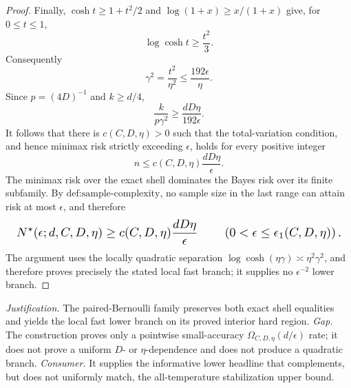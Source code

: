 \documentclass{article}
\begin{document}
\begin{proof}
Finally, \(\cosh t\ge1+t^2/2\) and \(\log(1+x)\ge x/(1+x)\) give, for \(0\le t\le1\),
\[
\log\cosh t\ge\frac{t^2}{3}.
\]
Consequently
\[
\gamma^2=\frac{t^2}{\eta^2}\le\frac{192\epsilon}{\eta}.
\]
Since \(p=(4D)^{-1}\) and \(k\ge d/4\),
\[
\frac{k}{p\gamma^2}
\ge
\frac{dD\eta}{192\epsilon}.
\]
It follows that there is \(c(C,D,\eta)>0\) such that the total-variation condition, and hence minimax risk strictly exceeding \(\epsilon\), holds for every positive integer
\[
n\le c(C,D,\eta)\frac{dD\eta}{\epsilon}.
\]
The minimax risk over the exact shell dominates the Bayes risk over its finite subfamily. By \(\text{def:sample-complexity}\), no sample size in the last range can attain risk at most \(\epsilon\), and therefore
\[
\makebox[\linewidth][c]{\resizebox{0.98\linewidth}{!}{\(\displaystyle N^\star(\epsilon;d,C,D,\eta)
\ge
c(C,D,\eta)\frac{dD\eta}{\epsilon}
\qquad
\left(0<\epsilon\le\epsilon_1(C,D,\eta)\right).\)}}
\]
The argument uses the locally quadratic separation \(\log\cosh(\eta\gamma)\asymp\eta^2\gamma^2\), and therefore proves precisely the stated local fast branch; it supplies no \(\epsilon^{-2}\) lower branch.
\end{proof}
\par\smallskip\noindent \textit{Justification.} The paired-Bernoulli family preserves both exact shell equalities and yields the local fast lower branch on its proved interior hard region. \textit{Gap.} The construction proves only a pointwise small-accuracy \(\Omega_{C,D,\eta}(d/\epsilon)\) rate; it does not prove a uniform \(D\)- or \(\eta\)-dependence and does not produce a quadratic branch. \textit{Consumer.} It supplies the informative lower headline that complements, but does not uniformly match, the all-temperature stabilization upper bound.
\end{document}
